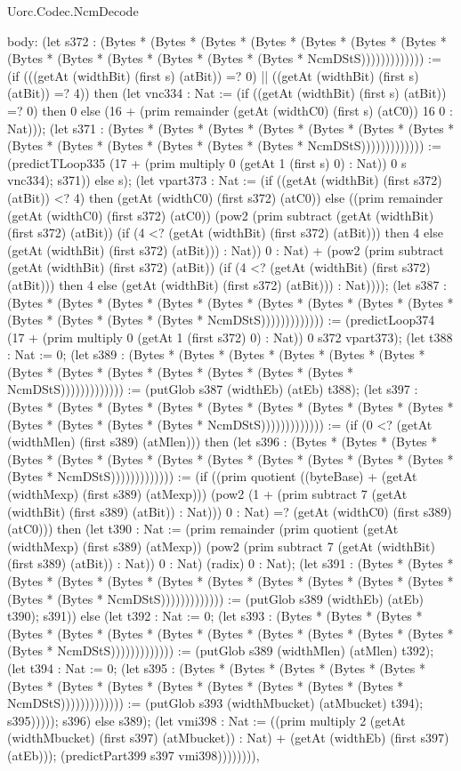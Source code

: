 \begin{lexlean}{Uorc.Codec.NcmDecode}
\begin{semanticmodule}
{  body: (let s372 : (Bytes * (Bytes * (Bytes * (Bytes * (Bytes * (Bytes * (Bytes * (Bytes * (Bytes * (Bytes * (Bytes * (Bytes * (Bytes * NcmDStS))))))))))))) := (if (((getAt (widthBit) (first s) (atBit)) =? 0) || ((getAt (widthBit) (first s) (atBit)) =? 4)) then (let vnc334 : Nat := (if ((getAt (widthBit) (first s) (atBit)) =? 0) then 0 else (16 + (prim remainder (getAt (widthC0) (first s) (atC0)) 16 0 : Nat))); (let s371 : (Bytes * (Bytes * (Bytes * (Bytes * (Bytes * (Bytes * (Bytes * (Bytes * (Bytes * (Bytes * (Bytes * (Bytes * (Bytes * NcmDStS))))))))))))) := (predictTLoop335 (17 + (prim multiply 0 (getAt 1 (first s) 0) : Nat)) 0 s vnc334); s371)) else s); (let vpart373 : Nat := (if ((getAt (widthBit) (first s372) (atBit)) <? 4) then (getAt (widthC0) (first s372) (atC0)) else ((prim remainder (getAt (widthC0) (first s372) (atC0)) (pow2 (prim subtract (getAt (widthBit) (first s372) (atBit)) (if (4 <? (getAt (widthBit) (first s372) (atBit))) then 4 else (getAt (widthBit) (first s372) (atBit))) : Nat)) 0 : Nat) + (pow2 (prim subtract (getAt (widthBit) (first s372) (atBit)) (if (4 <? (getAt (widthBit) (first s372) (atBit))) then 4 else (getAt (widthBit) (first s372) (atBit))) : Nat)))); (let s387 : (Bytes * (Bytes * (Bytes * (Bytes * (Bytes * (Bytes * (Bytes * (Bytes * (Bytes * (Bytes * (Bytes * (Bytes * (Bytes * NcmDStS))))))))))))) := (predictLoop374 (17 + (prim multiply 0 (getAt 1 (first s372) 0) : Nat)) 0 s372 vpart373); (let t388 : Nat := 0; (let s389 : (Bytes * (Bytes * (Bytes * (Bytes * (Bytes * (Bytes * (Bytes * (Bytes * (Bytes * (Bytes * (Bytes * (Bytes * (Bytes * NcmDStS))))))))))))) := (putGlob s387 (widthEb) (atEb) t388); (let s397 : (Bytes * (Bytes * (Bytes * (Bytes * (Bytes * (Bytes * (Bytes * (Bytes * (Bytes * (Bytes * (Bytes * (Bytes * (Bytes * NcmDStS))))))))))))) := (if (0 <? (getAt (widthMlen) (first s389) (atMlen))) then (let s396 : (Bytes * (Bytes * (Bytes * (Bytes * (Bytes * (Bytes * (Bytes * (Bytes * (Bytes * (Bytes * (Bytes * (Bytes * (Bytes * NcmDStS))))))))))))) := (if ((prim quotient ((byteBase) + (getAt (widthMexp) (first s389) (atMexp))) (pow2 (1 + (prim subtract 7 (getAt (widthBit) (first s389) (atBit)) : Nat))) 0 : Nat) =? (getAt (widthC0) (first s389) (atC0))) then (let t390 : Nat := (prim remainder (prim quotient (getAt (widthMexp) (first s389) (atMexp)) (pow2 (prim subtract 7 (getAt (widthBit) (first s389) (atBit)) : Nat)) 0 : Nat) (radix) 0 : Nat); (let s391 : (Bytes * (Bytes * (Bytes * (Bytes * (Bytes * (Bytes * (Bytes * (Bytes * (Bytes * (Bytes * (Bytes * (Bytes * (Bytes * NcmDStS))))))))))))) := (putGlob s389 (widthEb) (atEb) t390); s391)) else (let t392 : Nat := 0; (let s393 : (Bytes * (Bytes * (Bytes * (Bytes * (Bytes * (Bytes * (Bytes * (Bytes * (Bytes * (Bytes * (Bytes * (Bytes * (Bytes * NcmDStS))))))))))))) := (putGlob s389 (widthMlen) (atMlen) t392); (let t394 : Nat := 0; (let s395 : (Bytes * (Bytes * (Bytes * (Bytes * (Bytes * (Bytes * (Bytes * (Bytes * (Bytes * (Bytes * (Bytes * (Bytes * (Bytes * NcmDStS))))))))))))) := (putGlob s393 (widthMbucket) (atMbucket) t394); s395))))); s396) else s389); (let vmi398 : Nat := ((prim multiply 2 (getAt (widthMbucket) (first s397) (atMbucket)) : Nat) + (getAt (widthEb) (first s397) (atEb))); (predictPart399 s397 vmi398)))))))),
}
\end{semanticmodule}
\end{lexlean}
